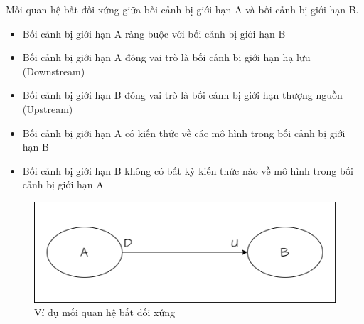 \begin{example} Mối quan hệ bất đối xứng giữa bối cảnh bị giới hạn A và bối cảnh bị giới hạn B.

    \begin{itemize}

        \item Bối cảnh bị giới hạn A ràng buộc với bối cảnh bị giới hạn B

        \item Bối cảnh bị giới hạn A đóng vai trò là bối cảnh bị giới hạn hạ lưu (Downstream)

        \item Bối cảnh bị giới hạn B đóng vai trò là bối cảnh bị giới hạn thượng nguồn (Upstream)

        \item Bối cảnh bị giới hạn A có kiến thức về các mô hình trong bối cảnh bị giới hạn B

        \item Bối cảnh bị giới hạn B không có bất kỳ kiến thức nào về mô hình trong bối cảnh bị giới hạn A

    \end{itemize}

    \begin{figure}[H]

        \centering

        \includegraphics[scale = 0.5]{pictures/moi_quan_he_bat_doi_xung/main.drawio.png}

        \caption{Ví dụ mối quan hệ bất đối xứng}

    \end{figure}

\end{example}




















